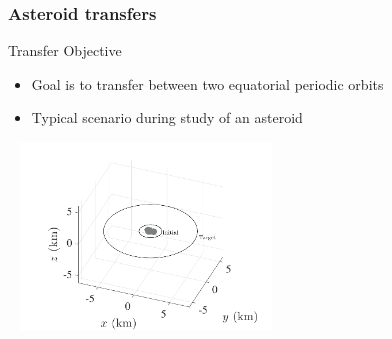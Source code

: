 

\subsubsection[4769 Castalia]{Asteroid transfers}

\begin{frame}{Transfer Objective}\label{slide:asteroid_transfer} %

\begin{itemize}
    \item Goal is to transfer between two equatorial periodic orbits
    \item Typical scenario during study of an asteroid~\hyperlink{slide:polyhedron_gravity}{}
\end{itemize}

\begin{center}
    ~\hfill
    \includegraphics[width=0.5\textwidth,height=0.7\textheight,keepaspectratio]{figures/2016AAS/initial_transfer_3d.pdf}
\end{center}

\end{frame}%

